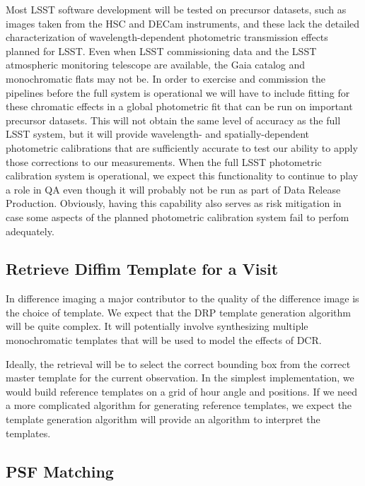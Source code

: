 Most LSST software development will be tested on precursor datasets, such as images taken from the HSC and DECam instruments, and these lack the detailed characterization of wavelength-dependent photometric transmission effects planned for LSST.  Even when LSST commissioning data and the LSST atmospheric monitoring telescope are available, the Gaia catalog and monochromatic flats may not be.  In order to exercise and commission the pipelines before the full system is operational we will have to include fitting for these chromatic effects in a global photometric fit that can be run on important precursor datasets.  This will not obtain the same level of accuracy as the full LSST system, but it will provide wavelength- and spatially-dependent photometric calibrations that are sufficiently accurate to test our ability to apply those corrections to our measurements.  When the full LSST photometric calibration system is operational, we expect this functionality to continue to play a role in QA even though it will probably not be run as part of Data Release Production.  Obviously, having this capability also serves as risk mitigation in case some aspects of the planned photometric calibration system fail to perfom adequately.

\subsection{Retrieve Diffim Template for a Visit}
\label{sec:acRetrieveTemplate}
In difference imaging a major contributor to the quality of the difference image is the choice of template.  We expect that the DRP template generation algorithm will be quite complex.  It will potentially involve synthesizing multiple monochromatic templates that will be used to model the effects of DCR.

Ideally, the retrieval will be to select the correct bounding box from the correct master template for the current observation.  In the simplest implementation, we would build reference templates on a grid of hour angle and positions.  If we need a more complicated algorithm for generating reference templates, we expect the template generation algorithm will provide an algorithm to interpret the templates.

\subsection{PSF Matching}
\label{sec:acPSFMatching}

